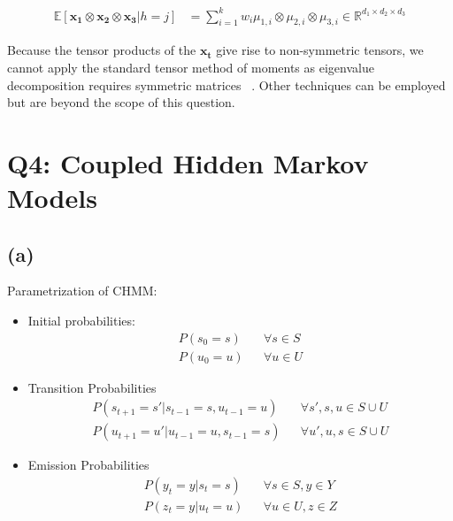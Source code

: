 \documentclass[11pt]{amsart}
\newcommand{\vek}[1]{\mathbf{#1}}
\begin{document}
\begin{equation}
\begin{aligned}
\mathbb{E}[\vek{x_1} \otimes \vek{x_2} \otimes \vek{x_3} \vert h=j] &= \sum_{i=1}^k w_i \mu_{1,i} \otimes \mu_{2, i} \otimes \mu_{3, i} \in \mathbb{R}^{d_1 \times d_2 \times d_3}
\end{aligned}
\end{equation}

Because the tensor products of the $\vek{x_t}$ give rise to non-symmetric tensors, we cannot apply the standard tensor method of moments as eigenvalue decomposition requires symmetric matrices ~\cite{anandkumar2014tensor}. Other techniques can be employed but are beyond the scope of this question.


\section{Q4: Coupled Hidden Markov Models}

\subsection{(a)}

Parametrization of CHMM:

\begin{itemize}

\item Initial probabilities:
\begin{equation}
\begin{aligned}
P(s_0 = s) && \forall s \in S \\
P(u_0 = u) && \forall u \in U
\end{aligned}
\end{equation}

\item Transition Probabilities
\begin{equation}
\begin{aligned}
P(s_{t+1} = s' \vert s_{t-1} = s, u_{t-1} = u) && \forall s', s, u \in S \cup U\\
P(u_{t+1} = u' \vert u_{t-1} = u, s_{t-1} = s) && \forall u', u, s \in S \cup U
\end{aligned}
\end{equation}

\item Emission Probabilities
\begin{equation}
\begin{aligned}
P(y_t = y \vert s_t = s) && \forall s \in S, y \in Y \\
P(z_t = y \vert u_t = u) && \forall u \in U, z \in Z
\end{aligned}
\end{equation}

\end{itemize}
\end{document}
